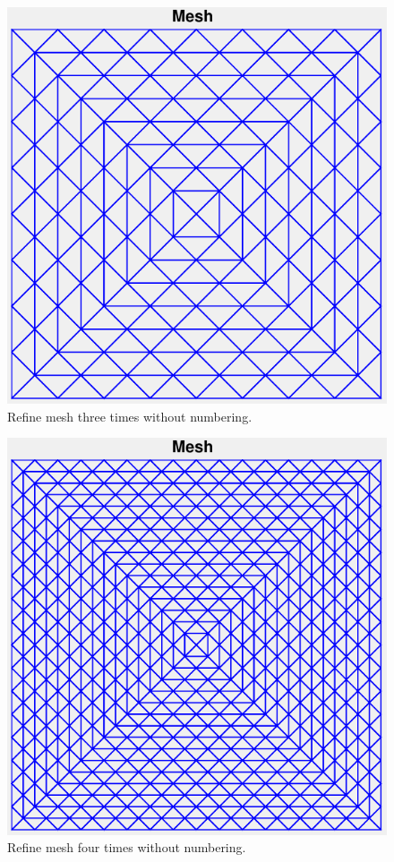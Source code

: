 \documentclass[11pt,a4paper,center,notitlepage]{article}
\numberwithin{equation}{section}
\begin{document}
\begin{figure}[H]
\centering
\includegraphics[scale=0.9]{4}
\caption{Refine mesh three times without numbering.}
\label{fig15}
\end{figure}

\begin{figure}[H]
\centering
\includegraphics[scale=0.9]{5}
\caption{Refine mesh four times without numbering.}
\label{fig16}
\end{figure}
\end{document}
